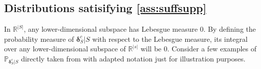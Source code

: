 \documentclass{article}
\newcommand{\A}{\mathbf{A}}
\newcommand{\Z}{\mathcal{Z}}
\newcommand{\deltaBold}{\boldsymbol{\delta}}
\newcommand{\deltaz}{\deltaBold^z}
\newcommand{\deltac}{\deltaBold^c}
\begin{document}

\subsection{Distributions satisifying \cref{ass:suffsupp}}
\label{apx:suffsupp}

In $\mathbb{R}^{|S|}$, any lower-dimensional subspace has Lebesgue measure 0. By defining the probability measure of $\deltac_S | S$ with respect to the Lebesgue measure, its integral over any lower-dimensional subspace of $\mathbb{R}^{|s|}$ will be 0. Consider a few examples of $\mathbb{P}_{\deltac_S | S}$ directly taken from \citep{lachapelle2023synergies} with adapted notation just for illustration purposes.
\end{document}

